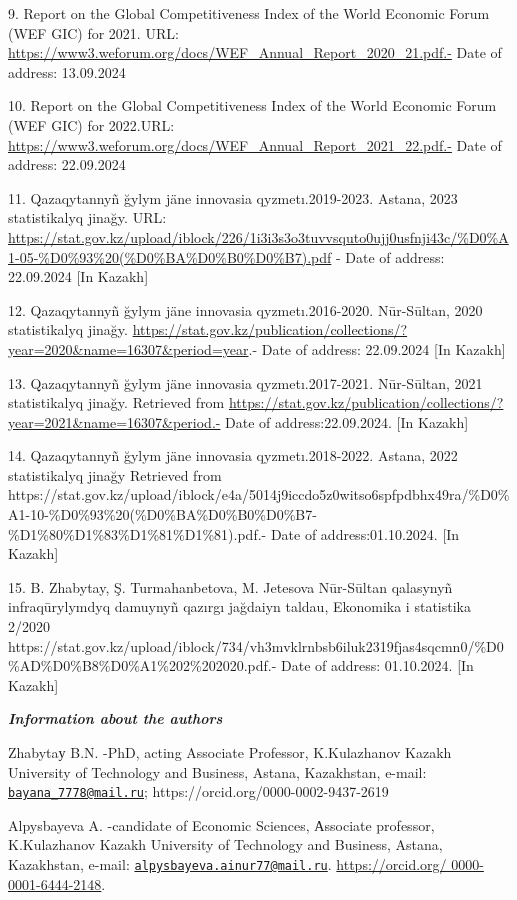 9. Report on the Global Competitiveness Index of the World Economic
Forum (WEF GIC) for 2021. URL:
\url{https://www3.weforum.org/docs/WEF_Annual_Report_2020_21.pdf.-} Date
of address: 13.09.2024

10. Report on the Global Competitiveness Index of the World Economic
Forum (WEF GIC) for 2022.URL:
\url{https://www3.weforum.org/docs/WEF_Annual_Report_2021_22.pdf.-} Date
of address: 22.09.2024

11. Qazaqytannyñ ğylym jäne innovasia qyzmetı.2019-2023. Astana, 2023
statistikalyq jinağy. URL:
\url{https://stat.gov.kz/upload/iblock/226/1i3i3s3o3tuvvsquto0ujj0usfnji43c/\%D0\%A1-05-\%D0\%93\%20(\%D0\%BA\%D0\%B0\%D0\%B7).pdf}
- Date of address: 22.09.2024 {[}In Kazakh{]}

12. Qazaqytannyñ ğylym jäne innovasia qyzmetı.2016-2020. Nūr-Sūltan,
2020 statistikalyq jinağy.
\url{https://stat.gov.kz/publication/collections/?year=2020&name=16307&period=year}.-
Date of address: 22.09.2024 {[}In Kazakh{]}

13. Qazaqytannyñ ğylym jäne innovasia qyzmetı.2017-2021. Nūr-Sūltan,
2021 statistikalyq jinağy. Retrieved from
\url{https://stat.gov.kz/publication/collections/?year=2021&name=16307&period.-}
Date of address:22.09.2024. {[}In Kazakh{]}

14. Qazaqytannyñ ğylym jäne innovasia qyzmetı.2018-2022. Astana, 2022
statistikalyq jinağy Retrieved from
https://stat.gov.kz/upload/iblock/e4a/5014j9iccdo5z0witso6spfpdbhx49ra/\%D0\%A1-10-\%D0\%93\%20(\%D0\%BA\%D0\%B0\%D0\%B7-\%D1\%80\%D1\%83\%D1\%81\%D1\%81).pdf.-
Date of address:01.10.2024. {[}In Kazakh{]}

15. B. Zhabytay, Ş. Turmahanbetova, M. Jetesova Nūr-Sūltan qalasynyñ
infraqūrylymdyq damuynyñ qazırgı jağdaiyn taldau, Ekonomika i statistika
2/2020
https://stat.gov.kz/upload/iblock/734/vh3mvklrnbsb6iluk2319fjas4sqcmn0/\%D0\%AD\%D0\%B8\%D0\%A1\%202\%202020.pdf.-
Date of address: 01.10.2024. {[}In Kazakh{]}

\emph{{\bfseries Information about the authors}}

Zhabytaу B.N. -PhD, acting Associate Professor, K.Kulazhanov Kazakh
University of Technology and Business, Astana, Kazakhstan, e-mail:
\href{mailto:bayana_7778@mail.ru}{\nolinkurl{bayana\_7778@mail.ru}};
https://orcid.org/0000-0002-9437-2619

Alpysbayeva A. -candidate of Economic Sciences, Аssociate professor,
K.Kulazhanov Kazakh University of Technology and Business, Astana,
Kazakhstan, e-mail:
\href{mailto:alpysbayeva.ainur77@mail.ru}{\nolinkurl{alpysbayeva.ainur77@mail.ru}}.
\href{https://orcid.org/\%200000-0001-6444-2148}{https://orcid.org/
0000-0001-6444-2148}.

